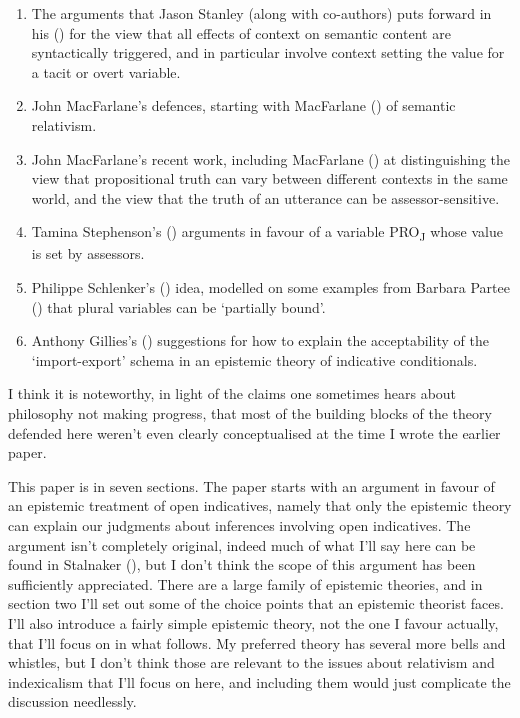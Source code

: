 \documentclass[
  10pt,
  letterpaper,
  DIV=11,
  numbers=noendperiod,
  twoside]{scrartcl}
\providecommand{\tightlist}{%
  \setlength{\itemsep}{0pt}\setlength{\parskip}{0pt}}\usepackage{longtable,booktabs,array}
\begin{document}
\begin{enumerate}
\def\labelenumi{\arabic{enumi}.}
\tightlist
\item
  The arguments that Jason Stanley (along with co-authors) puts forward
  in his () for the view that all
  effects of context on semantic content are syntactically triggered,
  and in particular involve context setting the value for a tacit or
  overt variable.
\item
  John MacFarlane's defences, starting with MacFarlane
  () of semantic relativism.
\item
  John MacFarlane's recent work, including MacFarlane
  () at distinguishing the view
  that propositional truth can vary between different contexts in the
  same world, and the view that the truth of an utterance can be
  assessor-sensitive.
\item
  Tamina Stephenson's () arguments in
  favour of a variable PRO\textsubscript{J} whose value is set by
  assessors.
\item
  Philippe Schlenker's () idea,
  modelled on some examples from Barbara Partee
  () that plural variables can be
  `partially bound'.
\item
  Anthony Gillies's ()
  suggestions for how to explain the acceptability of the
  `import-export' schema in an epistemic theory of indicative
  conditionals.
\end{enumerate}

I think it is noteworthy, in light of the claims one sometimes hears
about philosophy not making progress, that most of the building blocks
of the theory defended here weren't even clearly conceptualised at the
time I wrote the earlier paper.

This paper is in seven sections. The paper starts with an argument in
favour of an epistemic treatment of open indicatives, namely that only
the epistemic theory can explain our judgments about inferences
involving open indicatives. The argument isn't completely original,
indeed much of what I'll say here can be found in Stalnaker
(), but I don't think the scope
of this argument has been sufficiently appreciated. There are a large
family of epistemic theories, and in section two I'll set out some of
the choice points that an epistemic theorist faces. I'll also introduce
a fairly simple epistemic theory, not the one I favour actually, that
I'll focus on in what follows. My preferred theory has several more
bells and whistles, but I don't think those are relevant to the issues
about relativism and indexicalism that I'll focus on here, and including
them would just complicate the discussion needlessly.
\end{document}
